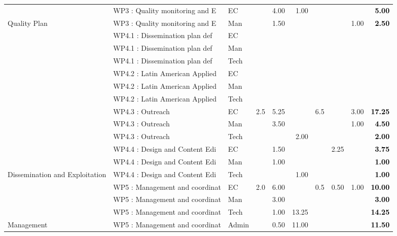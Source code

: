 \documentclass[
  a4paperpaper,
  onecolumn]{article}
\begin{document}
\begin{table}[H]
{\begin{tabular}[t]{lllrrrrrr|>{}r}
\cmidrule{1-10}
 & WP3 : Quality monitoring and E & EC &  & 4.00 & 1.00 &  &  &  & \textcolor{black}{\textbf{5.00}}\\
\cmidrule{2-10}
\multirow{-2}{*}{\raggedright\arraybackslash Quality Plan} & WP3 : Quality monitoring and E & Man &  & 1.50 &  &  &  & 1.00 & \textcolor{black}{\textbf{2.50}}\\
\cmidrule{1-10}
 & WP4.1 : Dissemination plan def & EC &  &  &  &  &  &  & \textcolor{black}{\textbf{}}\\
\cmidrule{2-10}
 & WP4.1 : Dissemination plan def & Man &  &  &  &  &  &  & \textcolor{black}{\textbf{}}\\
\cmidrule{2-10}
 & WP4.1 : Dissemination plan def & Tech &  &  &  &  &  &  & \textcolor{black}{\textbf{}}\\
\cmidrule{2-10}
 & WP4.2 : Latin American Applied & EC &  &  &  &  &  &  & \textcolor{black}{\textbf{}}\\
\cmidrule{2-10}
 & WP4.2 : Latin American Applied & Man &  &  &  &  &  &  & \textcolor{black}{\textbf{}}\\
\cmidrule{2-10}
 & WP4.2 : Latin American Applied & Tech &  &  &  &  &  &  & \textcolor{black}{\textbf{}}\\
\cmidrule{2-10}
 & WP4.3 : Outreach & EC & 2.5 & 5.25 &  & 6.5 &  & 3.00 & \textcolor{black}{\textbf{17.25}}\\
\cmidrule{2-10}
 & WP4.3 : Outreach & Man &  & 3.50 &  &  &  & 1.00 & \textcolor{black}{\textbf{4.50}}\\
\cmidrule{2-10}
 & WP4.3 : Outreach & Tech &  &  & 2.00 &  &  &  & \textcolor{black}{\textbf{2.00}}\\
\cmidrule{2-10}
 & WP4.4 : Design and Content Edi & EC &  & 1.50 &  &  & 2.25 &  & \textcolor{black}{\textbf{3.75}}\\
\cmidrule{2-10}
 & WP4.4 : Design and Content Edi & Man &  & 1.00 &  &  &  &  & \textcolor{black}{\textbf{1.00}}\\
\cmidrule{2-10}
\multirow{-12}{*}{\raggedright\arraybackslash Dissemination and Exploitation} & WP4.4 : Design and Content Edi & Tech &  &  & 1.00 &  &  &  & \textcolor{black}{\textbf{1.00}}\\
\cmidrule{1-10}
 & WP5 : Management and coordinat & EC & 2.0 & 6.00 &  & 0.5 & 0.50 & 1.00 & \textcolor{black}{\textbf{10.00}}\\
\cmidrule{2-10}
 & WP5 : Management and coordinat & Man &  & 3.00 &  &  &  &  & \textcolor{black}{\textbf{3.00}}\\
\cmidrule{2-10}
 & WP5 : Management and coordinat & Tech &  & 1.00 & 13.25 &  &  &  & \textcolor{black}{\textbf{14.25}}\\
\cmidrule{2-10}
\multirow{-4}{*}{\raggedright\arraybackslash Management} & WP5 : Management and coordinat & Admin &  & 0.50 & 11.00 &  &  &  & \textcolor{black}{\textbf{11.50}}\\
\bottomrule
\end{tabular}}
\end{table}
\end{document}
